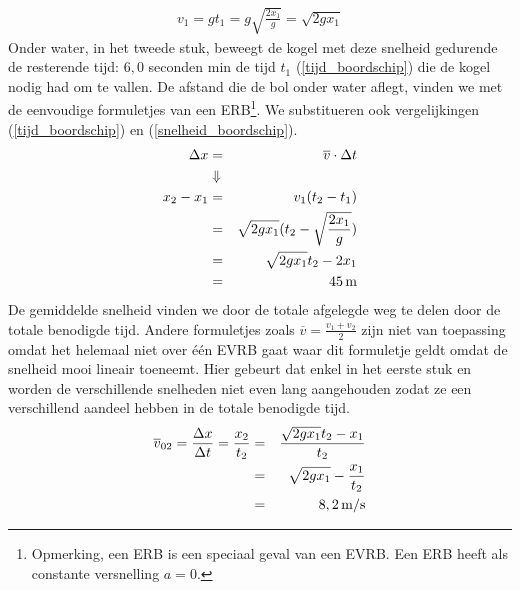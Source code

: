 \documentclass{ximera}
\begin{document}
\begin{exercise}
\begin{oplossing}
	\begin{eqnarray}
	v_1=gt_1\nonumber=g\sqrt{\frac{2x_1}{g}}\nonumber=\sqrt{2gx_1}
	\end{eqnarray}
	Onder water, in het tweede stuk, beweegt de kogel met deze snelheid gedurende de resterende tijd: $6,0$ seconden min de tijd $t_1$ (\ref{tijd_boordschip}) die de kogel nodig had om te vallen. De afstand die de bol onder water aflegt, vinden we met de eenvoudige formuletjes van een ERB\footnote{Opmerking, een ERB is een speciaal geval van een EVRB. Een ERB heeft als constante versnelling $a=0$.}. We substitueren ook vergelijkingen (\ref{tijd_boordschip}) en (\ref{snelheid_boordschip}).
	\begin{eqnarray*}
	\Delta x&=&\overline{v}\cdot\Delta t\\
	&\Downarrow&\\
	x_2-x_1&=&v_1(t_2-t_1)\\
	&=&\sqrt{2gx_1}(t_2-\sqrt{\frac{2x_1}{g}})\\
	&=&\sqrt{2gx_1}t_2-2x_1\\
	&=&45\rm\,m
	\end{eqnarray*}
	De gemiddelde snelheid vinden we door de totale afgelegde weg te delen door de totale benodigde tijd. Andere formuletjes zoals $\overline{v}=\frac{v_1+v_2}{2}$ zijn niet van toepassing omdat het helemaal niet over \'e\'en EVRB gaat waar dit formuletje geldt omdat de snelheid mooi lineair toeneemt. Hier gebeurt dat enkel in het eerste stuk en worden de verschillende snelheden niet even lang aangehouden zodat ze een verschillend aandeel hebben in de totale benodigde tijd.
	\begin{eqnarray*}
	\overline{v}_{02}=\frac{\Delta x}{\Delta t}=\frac{x_2}{t_2}&=&\frac{\sqrt{2gx_1}t_2-x_1}{t_2}\\
	&=&\sqrt{2gx_1}-\frac{x_1}{t_2}\\
	&=&8,2\rm\,m/s
	\end{eqnarray*}
	\end{oplossing}
	\end{exercise}
	
\end{document}
